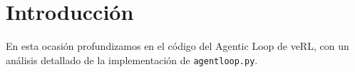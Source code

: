 \section{Introducción}
En esta ocasión profundizamos en el código del Agentic Loop de veRL, con un análisis detallado de la implementación de \texttt{agentloop.py}.

